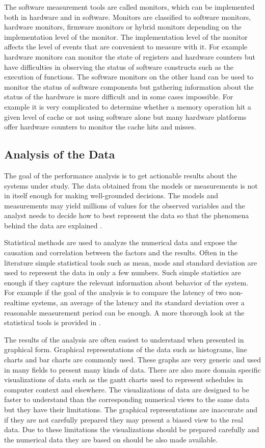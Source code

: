 The software measurement tools are called monitors, which can be implemented both in hardware and in software. Monitors are classified to software monitors, hardware monitors, firmware monitors or hybrid monitors depending on the implementation level of the monitor. The implementation level of the monitor affects the level of events that are convenient to measure with it. For example hardware monitors can monitor the state of registers and hardware counters but have difficulties in observing the status of software constructs such as the execution of functions. The software monitors on the other hand can be used to monitor the status of software components but gathering information about the status of the hardware is more difficult and in some cases impossible. \cite{jain1991art} For example it is very complicated to determine whether a memory operation hit a given level of cache or not using software alone but many hardware platforms offer hardware counters to monitor the cache hits and misses.

\subsection{Analysis of the Data}
\label{subsec:data-analysis}
The goal of the performance analysis is to get actionable results about the systems under study. The data obtained from the models or measurements is not in itself enough for making well-grounded decisions. The models and measurements may yield millions of values for the observed variables and the analyst needs to decide how to best represent the data so that the phenomena behind the data are explained \cite{jain1991art}.

Statistical methods are used to analyze the numerical data and expose the causation and correlation between the factors and the results. Often in the literature simple statistical tools such as mean, mode and standard deviation are used to represent the data in only a few numbers. Such simple statistics are enough if they capture the relevant information about behavior of the system. For example if the goal of the analysis is to compare the latency of two non-realtime systems, an average of the latency and its standard deviation over a reasonable measurement period can be enough. A more thorough look at the statistical tools is provided in \cite{jain1991art}.

The results of the analysis are often easiest to understand when presented in graphical form. Graphical representations of the data such as histograms, line charts and bar charts are commonly used. These graphs are very generic and used in many fields to present many kinds of data. There are also more domain specific visualizations of data such as the gantt charts used to represent schedules in computer context and elsewhere. The visualizations of data are designed to be faster to understand than the corresponding numerical views to the same data but they have their limitations. The graphical representations are inaccurate and if they are not carefully prepared they may present a biased view to the real data. Due to these limitations the visualizations should be prepared carefully and the numerical data they are based on should be also made available.~\cite{jain1991art}
